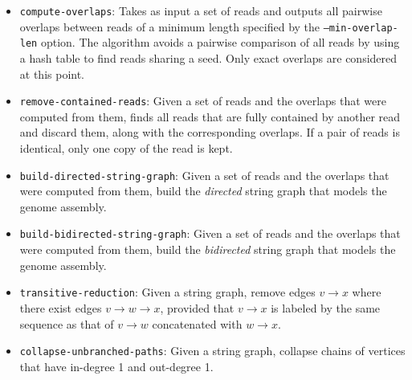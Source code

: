 \documentclass[letterpaper,12pt]{article}
\begin{document}
\begin{itemize}
\item
	{\tt compute-overlaps}:  Takes as input a set of reads and outputs all
	pairwise overlaps between reads of a minimum length specified by the
	{\tt --min-overlap-len} option.  The algorithm avoids a pairwise
	comparison of all reads by using a hash table to find reads sharing a
	seed.  Only exact overlaps are considered at this point.


\item
	{\tt remove-contained-reads}:
	Given a set of reads and the overlaps that were computed from them,
	finds all reads that are fully contained by another read and discard
	them, along with the corresponding overlaps.  If a pair of reads is
	identical, only one copy of the read is kept.

\item
	{\tt build-directed-string-graph}:
	Given a set of reads and the overlaps that were computed from them,
	build the {\em directed} string graph that models the genome assembly.
\item
	{\tt build-bidirected-string-graph}:
	Given a set of reads and the overlaps that were computed from them,
	build the {\em bidirected} string graph that models the genome assembly.


\item
	{\tt transitive-reduction}:
	Given a string graph, remove edges $v \to x$ where there exist edges $v
	\to w \to x$, provided that $v \to x$ is labeled by the same sequence as
	that of $v \to w$ concatenated with $w \to x$. 

\item
	{\tt collapse-unbranched-paths}:
	Given a string graph, collapse chains of vertices that have in-degree 1
	and out-degree 1.


\end{itemize}
\end{document}
